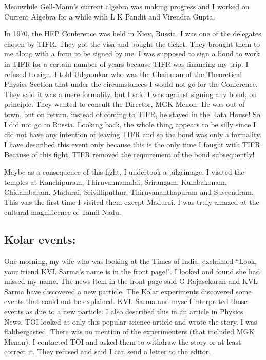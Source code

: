 Meanwhile Gell-Mann's current algebra was making progress and I worked 
on Current Algebra for a while with L K Pandit and Virendra Gupta.

In 1970, the HEP Conference was held in Kiev, Russia. I was one of the 
delegates chosen by TIFR. They got the visa and bought the ticket. They 
brought them to me along with a form to be signed by me. I was supposed 
to sign a bond to work in TIFR for a certain number of years because 
TIFR was financing my trip. I refused to sign. I told Udgaonkar who was 
the Chairman of the Theoretical Physics Section that under the 
circumstances I would not go for the Conference. They said it was a mere 
formality, but I said I was against signing any bond, on principle. They 
wanted to consult the Director, MGK Menon. He was out of town, but on 
return, instead of coming to TIFR, he stayed in the Tata House! So I did 
not go to Russia. Looking back, the whole thing appears to be silly 
since I did not have any intention of leaving TIFR and so the bond was 
only a formality. I have described this event only because this is the 
only time I fought with TIFR. Because of this fight, TIFR removed the 
requirement of the bond subsequently!
\smallskip

Maybe as a consequence of this fight, I undertook a pilgrimage. I 
visited the temples at Kanchipuram, Thiruvannamalai, Srirangam, 
Kumbakonam, Chidambaram, Madurai, Srivilliputhur, Thiruvananthapuram and 
Suseendram. This was the first time I visited them except Madurai. I was 
truly amazed at the cultural magnificence of Tamil Nadu.

\subsection*{Kolar events: }

One morning, my wife who was looking at the Times of India, exclaimed 
``Look, your friend KVL Sarma's name is in the front page!". I looked and 
found she had missed my name. The news item in the front page said G 
Rajasekaran and KVL Sarma have discovered a new particle. The Kolar 
experiments discovered some events that could not be explained. KVL 
Sarma and myself interpreted those events as due to a new particle. I 
also described this in an article in Physics News. TOI looked at only 
this popular science article and wrote the story. I was flabbergasted. 
There was no mention of the experimenters (that included MGK Menon). I 
contacted TOI and asked them to withdraw the story or at least correct 
it. They refused and said I can send a letter to the editor.
\vskip 5pt

